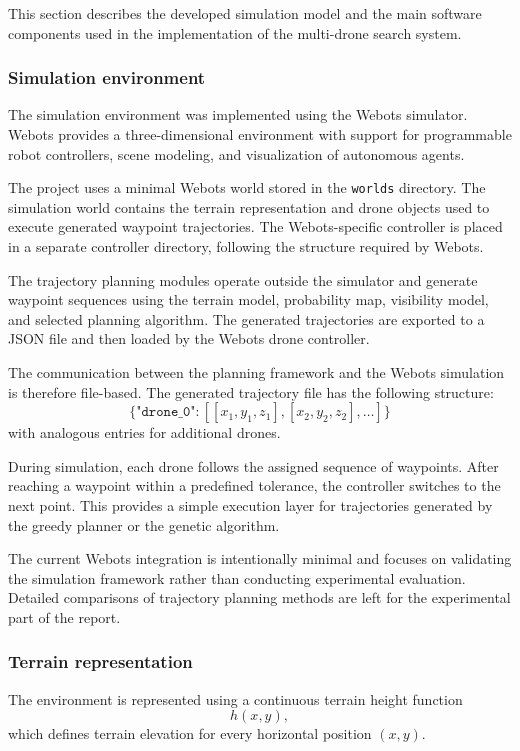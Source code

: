 \documentclass[english]{projectreport}
\begin{document}
This section describes the developed simulation model and the main software components used in the implementation of the multi-drone search system.

\subsubsection{Simulation environment}

The simulation environment was implemented using the Webots simulator. Webots provides a three-dimensional environment with support for programmable robot controllers, scene modeling, and visualization of autonomous agents.

The project uses a minimal Webots world stored in the \texttt{worlds} directory. The simulation world contains the terrain representation and drone objects used to execute generated waypoint trajectories. The Webots-specific controller is placed in a separate controller directory, following the structure required by Webots.

The trajectory planning modules operate outside the simulator and generate waypoint sequences using the terrain model, probability map, visibility model, and selected planning algorithm. The generated trajectories are exported to a JSON file and then loaded by the Webots drone controller.

The communication between the planning framework and the Webots simulation is therefore file-based. The generated trajectory file has the following structure:
\[
\{
\texttt{"drone\_0"} : [[x_1,y_1,z_1], [x_2,y_2,z_2], \dots]
\}
\]
with analogous entries for additional drones.

During simulation, each drone follows the assigned sequence of waypoints. After reaching a waypoint within a predefined tolerance, the controller switches to the next point. This provides a simple execution layer for trajectories generated by the greedy planner or the genetic algorithm.

The current Webots integration is intentionally minimal and focuses on validating the simulation framework rather than conducting experimental evaluation. Detailed comparisons of trajectory planning methods are left for the experimental part of the report.

\subsubsection{Terrain representation}

The environment is represented using a continuous terrain height function
\[
h(x,y),
\]
which defines terrain elevation for every horizontal position $(x,y)$.
\end{document}
